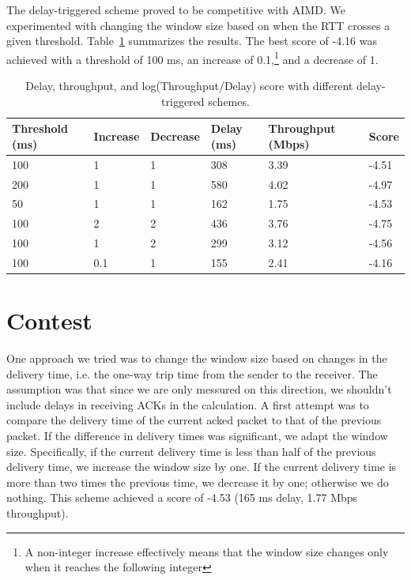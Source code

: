 \documentclass[a4paper,10pt]{article}
\begin{document}
The delay-triggered scheme proved to be competitive with AIMD. We experimented with 
changing the window size based on when the RTT crosses a given threshold. 
Table~\ref{tab:delayTriggered} summarizes the results. The best score of -4.16 was achieved with a threshold 
of 100 ms, an increase of 0.1,\footnote{A non-integer increase effectively means 
that the window size changes only when it reaches the following integer} and a 
decrease of 1.

\begin{table}[h]
 \centering
 \begin{tabular}{|l|l|l|l|p{2cm}|l|}
 \hline
   Threshold (ms) & Increase & Decrease & Delay (ms) & Throughput (Mbps) & Score \\
 \hline
  100 & 1 & 1 & 308 & 3.39 & -4.51 \\
  200 & 1 & 1 & 580 & 4.02 & -4.97 \\
  50  & 1 & 1 & 162 & 1.75 & -4.53 \\
  100 & 2 & 2 & 436 & 3.76 & -4.75 \\
  100 & 1 & 2 & 299 & 3.12 & -4.56 \\
  100 & 0.1 & 1 & 155 & 2.41 & -4.16 \\
  \hline
 \end{tabular}
 \caption{Delay, throughput, and log(Throughput/Delay) score with different 
 delay-triggered schemes.}
 \label{tab:delayTriggered}
\end{table}

\section{Contest}
One approach we tried was to change the window size based on changes in the delivery time, 
i.e. the one-way trip time from the sender to the receiver. The assumption was that since we 
are only messured on this direction, we shouldn't include delays in receiving ACKs in 
the calculation. A first attempt was to compare the delivery time of the current acked
packet to that of the previous packet. If the difference in delivery times was significant, 
we adapt the window size. Specifically, if the current delivery time is less than half
of the previous delivery time, we increase the window size by one. If the current 
delivery time is more than two times the previous time, we decrease it by one; otherwise 
we do nothing. This scheme achieved a score of -4.53 (165 ms delay, 1.77 Mbps throughput). 
\end{document}
